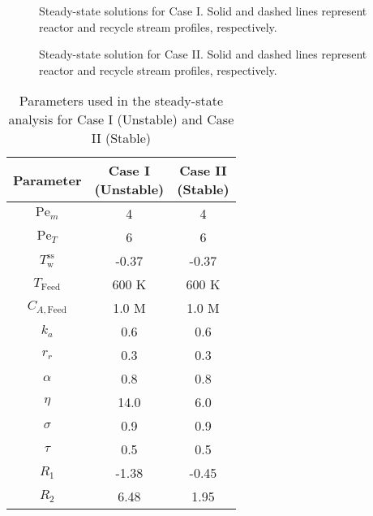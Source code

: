 \begin{figure}[!htbp]
    \centering
    
    \caption{Steady-state solutions for Case I. Solid and dashed lines represent reactor and recycle stream profiles, respectively.}
    \label{fig:3_ss_profiles}
\end{figure}

\begin{figure}[!htbp]
    \centering
    
    \caption{Steady-state solution for Case II. Solid and dashed lines represent reactor and recycle stream profiles, respectively.}
    \label{fig:3_ss_profiles_stable}
\end{figure}

\begin{table}[htbp]
\centering
\renewcommand{\arraystretch}{1.3}
\caption{Parameters used in the steady-state analysis for Case I (Unstable) and Case II (Stable)} \label{tab:3_pars}
\begin{tabular}{|c|c|c|}
\hline
\textbf{Parameter} & \makecell{\textbf{Case I} \\ \textbf{(Unstable)}} & \makecell{\textbf{Case II} \\ \textbf{(Stable)}} \\
\hline
$\mathrm{Pe}_m$  & 4        & 4      \\
$\mathrm{Pe}_T$  & 6        & 6      \\
$T_{\mathrm{w}}^{\mathrm{ss}}$ & -0.37 & -0.37  \\
$T_{\mathrm{Feed}}$ & 600 K & 600 K  \\
$C_{A, \mathrm{Feed}}$ & 1.0 M & 1.0 M  \\
$k_a$            & 0.6      & 0.6    \\
$r_r$            & 0.3      & 0.3    \\
$\alpha$         & 0.8      & 0.8    \\
$\eta$           & 14.0     & 6.0    \\
$\sigma$         & 0.9      & 0.9    \\
$\tau$           & 0.5      & 0.5    \\
$R_1$            & -1.38    & -0.45  \\
$R_2$            & 6.48     & 1.95   \\
\hline
\end{tabular}
\end{table}


